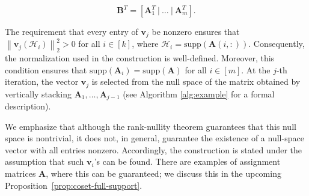 \documentclass[journal,draftcls,onecolumn]{IEEEtran}
\theoremstyle{mystyle}
\newcommand{\bfA}{\mathbf{A}}
\newcommand{\bfB}{\mathbf{B}}
\newcommand{\bfv}{\mathbf{v}}
\begin{document}
\begin{equation}\label{eq:recons}
\bfB^T = [\bfA_1^T ~|~ \dots ~|~\bfA_m^T].    
\end{equation}


The requirement that every entry of $\mathbf{v}_j$ be nonzero ensures that
$
\left\|\mathbf{v}_j(\mathcal{H}_i)\right\|_2^2 > 0$ for all  $i \in [k]$, where $\mathcal{H}_i =  \text{supp}(\mathbf{A}(i,:))$. Consequently, the normalization used in the construction is well-defined. Moreover, this condition ensures that 
$\text{supp}(\mathbf{A}_i)
=
\text{supp}(\mathbf{A})$ for all $ i \in [m]$. At the $j$-th iteration, the vector $\mathbf{v}_j$ is selected from the null space of the matrix obtained by vertically stacking $\mathbf{A}_1,\ldots,\mathbf{A}_{j-1}$ (see  Algorithm  \ref{alg:example} for a formal description).

We emphasize that although the rank-nullity theorem guarantees that this null space is nontrivial, it does not, in general, guarantee the existence of a null-space vector with all entries nonzero. Accordingly, the construction is stated under the assumption that such $\bfv_i$'s can be found. There are examples of assignment matrices $\mathbf{A}$, where this can be guaranteed; we discuss this in the upcoming Proposition~\ref{prop:coset-full-support}.

\end{document}
